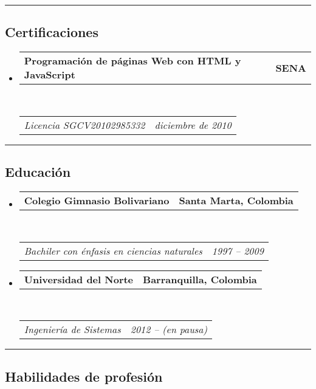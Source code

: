 \documentclass[10pt,a4paper]{article}
\makeatletter
\newcommand{\headerrow}[2]
{\begin{tabular*}{\linewidth}{l@{\extracolsep{\fill}}r}
	#1 &
	#2 \\
\end{tabular*}}
\makeatother
\begin{document}
\hrule
\vspace{-0.4em}
\subsection*{Certificaciones}

\begin{itemize}
	\parskip=0.1em

	\item 
	\headerrow
		{\textbf{Programación de páginas Web con HTML y JavaScript}}
		{\textbf{SENA}}
	\\
	\headerrow
		{\emph{Licencia SGCV20102985332}}
		{\emph{diciembre de 2010}}

\end{itemize}

\hrule
\vspace{-0.4em}
\subsection*{Educación}

\begin{itemize}
	\parskip=0.1em

	\item 
	\headerrow
		{\textbf{Colegio Gimnasio Bolivariano}}
		{\textbf{Santa Marta, Colombia}}
	\\
	\headerrow
		{\emph{Bachiler con énfasis en ciencias naturales}}
		{\emph{1997 -- 2009}}

	\item 
	\headerrow
	{\textbf{Universidad del Norte}}
	{\textbf{Barranquilla, Colombia}}
	\\
	\headerrow
	{\emph{Ingeniería de Sistemas}}
	{\emph{2012 -- (en pausa)}}
	

\end{itemize}


\hrule
\vspace{-0.4em}
\subsection*{Habilidades de profesión}
\end{document}
